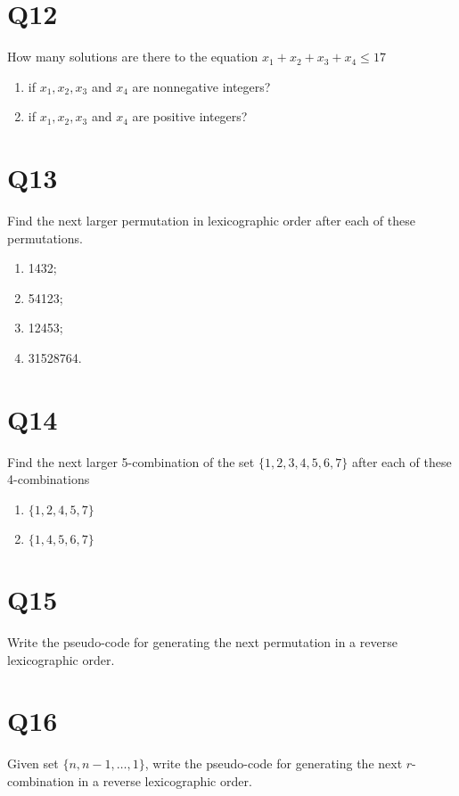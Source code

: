 \documentclass[11pt]{article}
\newenvironment{qparts}{\begin{enumerate}[{(}a{)}]}{\end{enumerate}}
\begin{document}
\section*{Q12}
How many solutions are there to the equation $x_1+x_2+x_3+x_4\le 17$
\begin{qparts}
    \item  if $x_1,x_2,x_3$ and $x_4$ are nonnegative integers?

    \item  if $x_1,x_2,x_3$ and $x_4$ are positive integers?
\end{qparts}

\section*{Q13}
Find the next larger permutation in lexicographic order after each of these permutations.
\begin{qparts}
    
    \item  1432;

    \item  54123;

    \item  12453;

    \item  31528764.
\end{qparts}

\section*{Q14}
Find the next larger 5-combination of the set $\{ 1,2,3,4,5,6,7 \}$ after each of these 4-combinations
\begin{qparts}
    
    \item  $\{ 1,2,4,5,7 \}$

    \item  $\{ 1,4,5,6,7 \}$

\end{qparts}

\section*{Q15}
Write the pseudo-code for generating the next permutation in a reverse lexicographic order.

\section*{Q16}
Given set $\{ n,n-1, \ldots ,1 \}$, write the pseudo-code for generating the next $r$-combination in a reverse lexicographic order.
\end{document}
